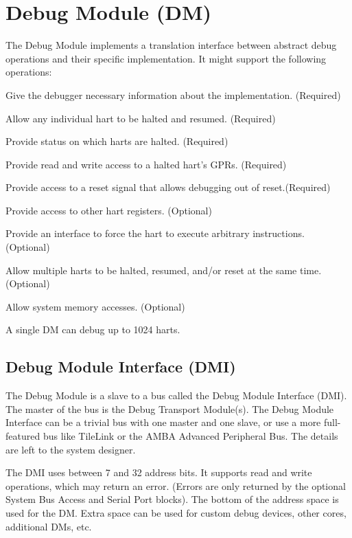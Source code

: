 
\chapter{Debug Module (DM)} \label{dm}

\begin{steps}{The Debug Module implements a translation interface between abstract debug
    operations and their specific implementation. It might support the following
    operations:}
\item Give the debugger necessary information about the implementation. (Required)
\item Allow any individual hart to be halted and resumed. (Required)
\item Provide status on which harts are halted. (Required)
\item Provide read and write access to a halted hart's GPRs. (Required)
\item Provide access to a reset signal that allows debugging out of reset.(Required)
\item Provide access to other hart registers. (Optional)
\item Provide an interface to force the hart to execute arbitrary instructions. (Optional)
\item Allow multiple harts to be halted, resumed, and/or reset at the same time. (Optional)
\item Allow system memory accesses. (Optional)
\end{steps}

A single DM can debug up to 1024 harts.

\section{Debug Module Interface (DMI)} \label{dmi}

The Debug Module is a slave to a bus called the Debug Module Interface (DMI). The
master of the bus is the Debug Transport Module(s).
The Debug Module Interface can be a trivial bus with one master and one slave,
or use a more full-featured bus like TileLink or the AMBA Advanced Peripheral
Bus. The details are left to the system designer.

The DMI uses between 7 and 32 address bits.  It supports read and write
operations, which may return an error. (Errors are only returned by the optional
System Bus Access and Serial Port blocks). The bottom of the address space is
used for the DM. Extra space can be used for custom debug devices, other cores,
additional DMs, etc.

